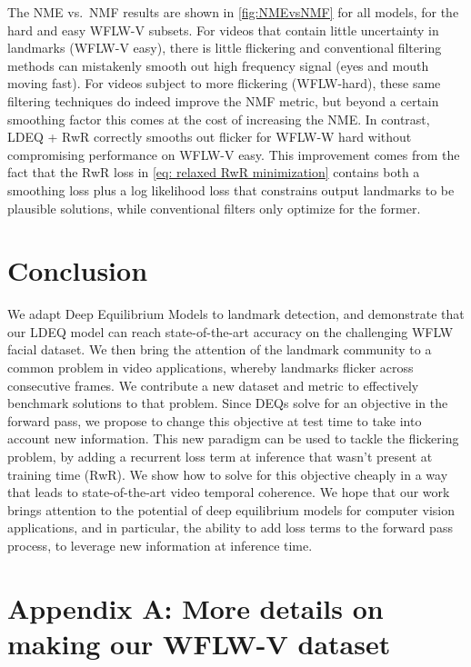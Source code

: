 \documentclass[10pt,twocolumn,letterpaper]{article}
\begin{document}
The NME vs.\ NMF results are shown in \cref{fig:NMEvsNMF} for all models, for the hard and easy WFLW-V subsets. For videos that contain little uncertainty in landmarks (WFLW-V easy), there is little flickering and conventional filtering methods can mistakenly smooth out high frequency signal (\eg eyes and mouth moving fast). For videos subject to more flickering (WFLW-hard), these same filtering techniques do indeed improve the NMF metric, but beyond a certain smoothing factor this comes at the cost of increasing the NME. In contrast, LDEQ + RwR correctly smooths out flicker for WFLW-W hard without compromising performance on WFLW-V easy. This improvement comes from the fact that the RwR loss in \cref{eq: relaxed RwR minimization} contains both a smoothing loss plus a log likelihood loss that constrains output landmarks to be plausible solutions, while conventional filters only optimize for the former.

\section{Conclusion}

We adapt Deep Equilibrium Models to landmark detection, and demonstrate that our LDEQ model can reach state-of-the-art accuracy on the challenging WFLW facial dataset. We then bring the attention of the landmark community to a common problem in video applications, whereby landmarks flicker across consecutive frames. We contribute a new dataset and metric to effectively benchmark solutions to that problem. Since DEQs solve for an objective in the forward pass, we propose to change this objective at test time to take into account new information. This new paradigm can be used to tackle the flickering problem, by adding a recurrent loss term at inference that wasn't present at training time (RwR). We show how to solve for this objective cheaply in a way that leads to state-of-the-art video temporal coherence. We hope that our work brings attention to the potential of deep equilibrium models for computer vision applications, and in particular, the ability to add loss terms to the forward pass process, to leverage new information at inference time.


\clearpage
{\small


}


\clearpage
\section*{\large{Appendix A: More details on making our WFLW-V dataset}}
\end{document}
